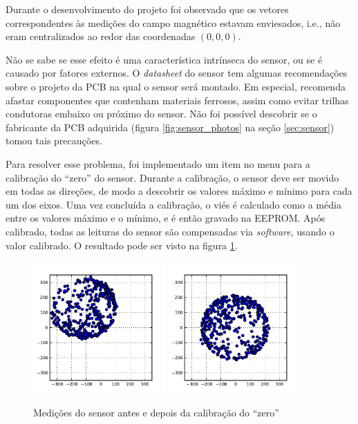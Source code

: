 \documentclass[brazil,pagestart=firstchapter]{abnt}
\makeatletter
\newcommand*{\ie}{i.e.\@\xspace}
\makeatother
\begin{document}
Durante o desenvolvimento do projeto foi observado que os vetores
correspondentes às medições do campo magnético estavam enviesados, \ie, não
eram centralizados ao redor das coordenadas $(0, 0, 0)$.

Não se sabe se esse efeito é uma característica intrínseca do sensor, ou se
é causado por fatores externos. O \textit{datasheet} do sensor tem algumas
recomendações sobre o projeto da \ac{PCB} na qual o sensor será montado. Em
especial, recomenda afastar componentes que contenham materiais ferrosos,
assim como evitar trilhas condutoras embaixo ou próximo do sensor.
\cite[p.~5]{HMC5883L} Não foi possível descobrir se o fabricante da \ac{PCB}
adquirida (figura \ref{fig:sensor_photos} na seção
\ref{sec:sensor}) tomou tais precauções.

Para resolver esse problema, foi implementado um item no menu para
a calibração do ``zero'' do sensor. Durante a calibração, o sensor deve ser
movido em todas as direções, de modo a descobrir os valores máximo e mínimo
para cada um dos eixos. Uma vez concluída a calibração, o viés é calculado
como a média entre os valores máximo e o mínimo, e é então gravado na
\ac{EEPROM}. Após calibrado, todas as leituras do sensor são compensadas via
\textit{software}, usando o valor calibrado. O resultado pode ser visto na
figura \ref{fig:zerocal}.

\begin{figure}[h]
\centering
\includegraphics[width=0.45\textwidth]{img/zerocal_off.pdf}
\includegraphics[width=0.45\textwidth]{img/zerocal_on.pdf}
\caption{Medições do sensor antes e depois da calibração do ``zero''}
\label{fig:zerocal}
\end{figure}
\end{document}
